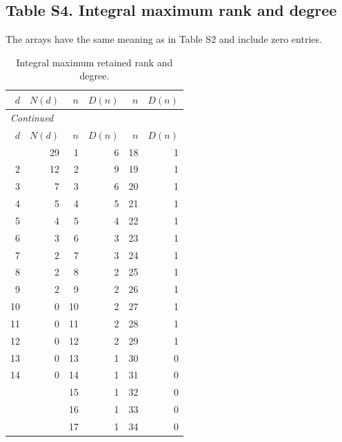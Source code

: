 \documentclass[12pt]{amsart}
\theoremstyle{remark}
\theoremstyle{definition}
\numberwithin{equation}{section}
\begin{document}
\clearpage
\subsection*{Table S4. Integral maximum rank and degree}
The arrays have the same meaning as in Table S2 and include zero entries.
\begingroup
\small
\begin{longtable}{rrrrrr}
\caption{Integral maximum retained rank and degree.}\label{tab:s4}\\
\toprule
$d$ & $N(d)$ & $n$ & $D(n)$ & $n$ & $D(n)$ \\
\midrule
\endfirsthead
\multicolumn{6}{l}{\textit{Continued}}\\
\toprule
$d$ & $N(d)$ & $n$ & $D(n)$ & $n$ & $D(n)$ \\
\midrule
\endhead
\midrule
\endfoot
\bottomrule
\endlastfoot
1 & 29 & 1 & 6 & 18 & 1 \\
2 & 12 & 2 & 9 & 19 & 1 \\
3 & 7 & 3 & 6 & 20 & 1 \\
4 & 5 & 4 & 5 & 21 & 1 \\
5 & 4 & 5 & 4 & 22 & 1 \\
6 & 3 & 6 & 3 & 23 & 1 \\
7 & 2 & 7 & 3 & 24 & 1 \\
8 & 2 & 8 & 2 & 25 & 1 \\
9 & 2 & 9 & 2 & 26 & 1 \\
10 & 0 & 10 & 2 & 27 & 1 \\
11 & 0 & 11 & 2 & 28 & 1 \\
12 & 0 & 12 & 2 & 29 & 1 \\
13 & 0 & 13 & 1 & 30 & 0 \\
14 & 0 & 14 & 1 & 31 & 0 \\
 &  & 15 & 1 & 32 & 0 \\
 &  & 16 & 1 & 33 & 0 \\
 &  & 17 & 1 & 34 & 0 \\
\end{longtable}
\endgroup

\clearpage
\setcounter{table}{2}
\renewcommand{\thetable}{\arabic{table}}
\renewcommand{\theHtable}{\arabic{table}}
\end{document}
